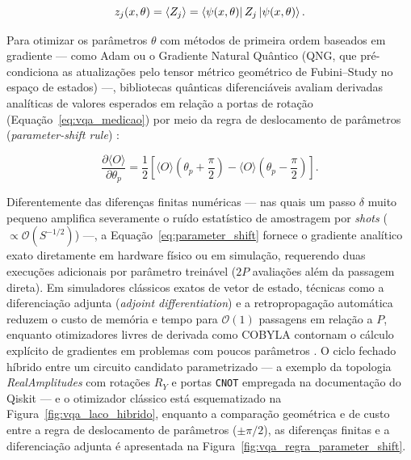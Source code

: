 \documentclass[
    12pt,
    openright,
    oneside,
    a4paper,
    english,
    brazil
]{abntex2}
\begin{document}
\begin{equation}
\label{eq:vqa_medicao}
z_j(x,\theta)
=
\langle Z_j \rangle
=
\bra{\psi(x,\theta)}
Z_j
\ket{\psi(x,\theta)}.
\end{equation}

Para otimizar os parâmetros \(\theta\) com métodos de primeira ordem baseados em gradiente --- como Adam \cite{kingma2015adam} ou o Gradiente Natural Quântico (QNG, que pré-condiciona as atualizações pelo tensor métrico geométrico de Fubini--Study no espaço de estados) ---, bibliotecas quânticas diferenciáveis avaliam derivadas analíticas de valores esperados em relação a portas de rotação (Equação~\eqref{eq:vqa_medicao}) por meio da regra de deslocamento de parâmetros (\textit{parameter-shift rule}) \cite{bergholm2018pennylane,cerezo2021variational,schuld2021effect}:

\begin{equation}
\label{eq:parameter_shift}
\frac{\partial \langle O \rangle}{\partial \theta_p}
=
\frac{1}{2}
\left[
\langle O \rangle\!\left(\theta_p + \frac{\pi}{2}\right)
-
\langle O \rangle\!\left(\theta_p - \frac{\pi}{2}\right)
\right].
\end{equation}

Diferentemente das diferenças finitas numéricas --- nas quais um passo \(\delta\) muito pequeno amplifica severamente o ruído estatístico de amostragem por \textit{shots} (\(\propto \mathcal{O}(S^{-1/2})\)) ---, a Equação~\eqref{eq:parameter_shift} fornece o gradiente analítico exato diretamente em hardware físico ou em simulação, requerendo duas execuções adicionais por parâmetro treinável (\(2P\) avaliações além da passagem direta). Em simuladores clássicos exatos de vetor de estado, técnicas como a diferenciação adjunta (\textit{adjoint differentiation}) e a retropropagação automática reduzem o custo de memória e tempo para \(\mathcal{O}(1)\) passagens em relação a \(P\), enquanto otimizadores livres de derivada como COBYLA contornam o cálculo explícito de gradientes em problemas com poucos parâmetros \cite{bergholm2018pennylane,daka2026noqcnn}. O ciclo fechado híbrido entre um circuito candidato parametrizado --- a exemplo da topologia \textit{RealAmplitudes} com rotações \(R_Y\) e portas \texttt{CNOT} empregada na documentação do Qiskit \cite{ibmQuantumRealAmplitudes2026} --- e o otimizador clássico está esquematizado na Figura~\ref{fig:vqa_laco_hibrido}, enquanto a comparação geométrica e de custo entre a regra de deslocamento de parâmetros (\(\pm \pi/2\)), as diferenças finitas e a diferenciação adjunta é apresentada na Figura~\ref{fig:vqa_regra_parameter_shift}.
\end{document}
